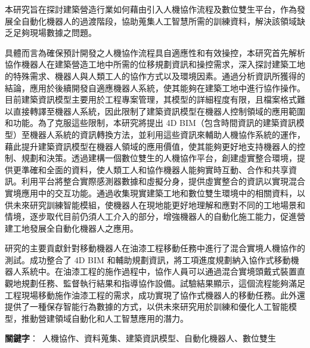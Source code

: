 本研究旨在探討建築營造行業如何藉由引入人機協作流程及數位雙生平台，作為發展全自動化機器人的過渡階段，協助蒐集人工智慧所需的訓練資料，解決該領域缺乏足夠現場數據之問題。

具體而言為確保預計開發之人機協作流程具自適應性和有效操控，本研究首先解析協作機器人在建築營造工地中所需的位移規劃資訊和操控需求，深入探討建築工地的特殊需求、機器人與人類工人的協作方式以及環境因素。通過分析資訊所獲得的結論，應用於後續開發自適應機器人系統，使其能夠在建築工地中進行協作操作。目前建築資訊模型主要用於工程專案管理，其模型的詳細程度有限，且檔案格式難以直接轉譯至機器人系統，因此限制了建築資訊模型在機器人控制領域的應用範圍和功能。為了克服這些限制，本研究將提出 4D BIM（包含時間資訊的建築資訊模型）至機器人系統的資訊轉換方法，並利用這些資訊來輔助人機協作系統的運作，藉此提升建築資訊模型在機器人領域的應用價值，使其能夠更好地支持機器人的控制、規劃和決策。透過建構一個數位雙生的人機協作平台，創建虛實整合環境，提供更準確和全面的資料，使人類工人和協作機器人能夠實時互動、合作和共享資訊。利用平台將整合實際感測器數據和虛擬分身，提供虛實整合的資訊以實現混合實境應用中的交互功能。通過收集現實建築工地和數位雙生環境中的相關資料，以供未來研究訓練智能模組，使機器人在現地能更好地理解和應對不同的工地場景和情境，逐步取代目前仍須人工介入的部分，增強機器人的自動化施工能力，促進營建工地發展全自動化機器人之應用。 

研究的主要貢獻針對移動機器人在油漆工程移動任務中進行了混合實境人機協作的測試。成功整合了 4D BIM 和輔助規劃資訊，將工項進度規劃納入協作式移動機器人系統中。在油漆工程的施作過程中，協作人員可以通過混合實境頭戴式裝置直觀地規劃任務、監督執行結果和指導協作設備。試驗結果顯示，這個流程能夠滿足工程現場移動施作油漆工程的需求，成功實現了協作式機器人的移動任務。此外還提供了一種保存智能行為數據的方式，以供未來研究用於訓練和優化人工智能模型，推動營建領域自動化和人工智慧應用的潛力。

\begin{flushleft}
\mbox{{\bf 關鍵字}： 人機協作、資料蒐集、建築資訊模型、自動化機器人、數位雙生}
\end{flushleft}
